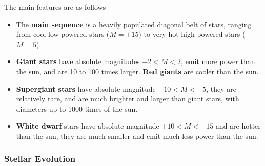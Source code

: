 The main features are as follows
\begin{itemize}
    \item The \textbf{main sequence} is a heavily populated diagonal belt of stars, ranging from cool low-powered stars ($M=+15$) to very hot high powered stars ($M=5$).
    \item \textbf{Giant stars} have absolute magnitudes $-2<M<2$, emit more power than the sun, and are 10 to 100 times larger. \textbf{Red giants} are cooler than the sun.
    \item \textbf{Supergiant stars} have absolute magnitude $-10<M<-5$, they are relatively rare, and are much brighter and larger than giant stars, with diameters up to 1000 times of the sun.
    \item \textbf{White dwarf} stars have absolute magnitude $+10<M<+15$ and are hotter than the sun, they are much smaller and emit much less power than the sun.
\end{itemize}

\subsubsection*{Stellar Evolution}

